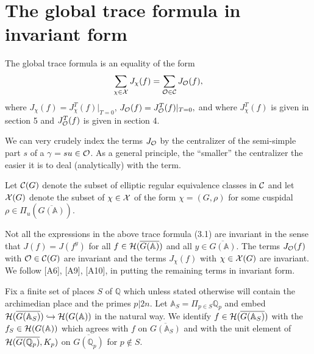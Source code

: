
\section{The global trace formula in invariant form}

The global trace formula is an equality of the form 
\begin{equation}
\sum_{\chi \in {\cal X}}J_\chi (f) =\sum_{{\cal{O}}\in {\cal C}}
J_{{\cal{O}}}(f),
\end{equation}
where $J_\chi (f)=J_\chi ^T(f)|_{T=0}$,
$J_{{\cal{O}}}(f)=J_{{\cal{O}}}^T(f)|_{T=0},$ and where
$J_\chi ^T(f)$ is given in section 5 and
$J_{{\cal{O}}}^T(f)$ is given in section 4.

We can very crudely index the terms $J_{\cal{O}}$ by the centralizer
of the semi-simple part $s$ of a $\gamma =su\in {\cal{O}}$. As a
general principle, the ``smaller'' the centralizer the easier it is
to deal (analytically) with the term. 

Let ${\cal C}(G)$ denote the subset
of elliptic regular equivalence classes in ${\cal C}$ and let
${\cal{X}}(G)$
denote the subset of $\chi \in {\cal{X}}$ of the form $\chi=(G,\rho )$ for
some cuspidal
$\rho \in \Pi _u(\overline{G({\mathbb {A}})})$.

Not all the expressions in the above trace formula (3.1) are invariant in
the sense that $J(f)=J(f^y)$ for all
$f\in {\cal{H}}(\overline{G({\mathbb {A}})}) $ and all
$y\in \overline{G({\mathbb {A}})}$. The terms $J_{{\cal{O}}}(f)$
with ${\cal{O}}\in {\cal{C}}(G)$ are invariant and the terms
$J_\chi (f)$ with $\chi \in {\cal{X}}(G)$ are invariant.
We follow [A6], [A9], [A10], in putting
the remaining terms in invariant form.

Fix a finite set of places $S$ of ${\mathbb {Q}}$ which
unless stated otherwise
will contain the archimedian place and the primes $p|2n$.
Let ${\mathbb {A}}_S=\Pi _{p\in S}{\mathbb {Q}}_p$ and embed
${\cal{H}}(\overline{G({\mathbb{A}}_S)})\hookrightarrow {\cal{H}}(G({\mathbb {A}))}$
in the natural way. We identify $f\in {\cal{H}}(\overline{G({\mathbb{A}}_S)})$
with the $f_S\in {\cal{H}}(G({\mathbb {A}}))$ which agrees
with $f$ on $\overline{G({\mathbb{A}}_S)}$ and with the unit
element of ${\cal{H}}(\overline{G({\mathbb{Q}}_p)},K_p)$
on $\overline{G({\mathbb{Q}}_p)} $ for $p\notin S$.


